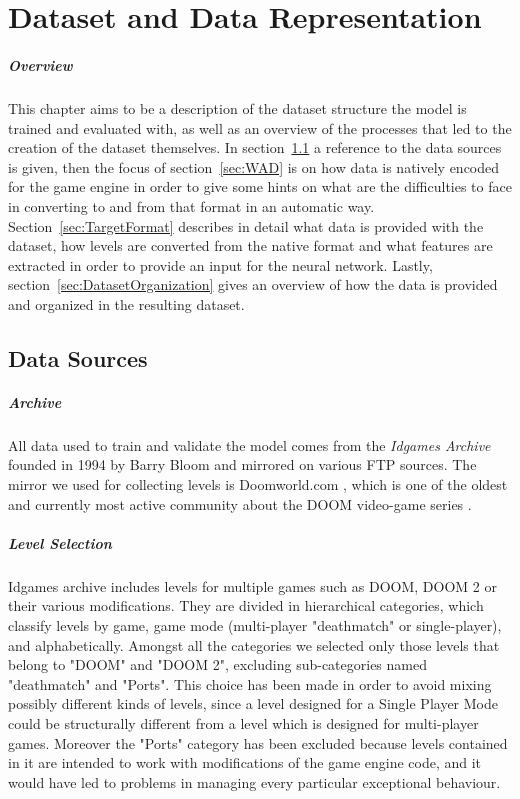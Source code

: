 \chapter{Dataset and Data Representation}
\paragraph{Overview}
This chapter aims to be a description of the dataset structure the model is trained and evaluated with, as well as an overview of the processes that led to the creation of the dataset themselves.
In section~\ref{sec:Sources} a reference to the data sources is given, then the focus of section~\ref{sec:WAD} is on how data is natively encoded for the game engine in order to give some hints on what are the difficulties to face in converting to and from that format in an automatic way. Section~\ref{sec:TargetFormat} describes in detail what data is provided with the dataset, how levels are converted from the native format and what features are extracted in order to provide an input for the neural network. Lastly, section~\ref{sec:DatasetOrganization} gives an overview of how the data is provided and organized in the resulting dataset.
 
\section{Data Sources}
\label{sec:Sources}
\paragraph{Archive} All data used to train and validate the model comes from the \textit{Idgames Archive} founded in 1994 by Barry Bloom \cite{idarchivehistory} and mirrored on various FTP sources. The mirror we used for collecting levels is Doomworld.com \cite{url:doomworld}, which is one of the oldest and currently most active community about the DOOM video-game series \cite{wiki:doomworld}.
\paragraph{Level Selection} Idgames archive includes levels for multiple games such as DOOM, DOOM 2 or their various modifications. They are divided in hierarchical categories, which classify levels by game, game mode (multi-player "deathmatch" or single-player), and alphabetically.
Amongst all the categories we selected only those levels that belong to "DOOM" and "DOOM 2", excluding sub-categories named "deathmatch" and "Ports". This choice has been made in order to avoid mixing possibly different kinds of levels, since a level designed for a Single Player Mode could be structurally different from a level which is designed for multi-player games. Moreover the "Ports" category has been excluded because levels contained in it are intended to work with modifications of the game engine code, and it would have led to problems in managing every particular exceptional behaviour.


